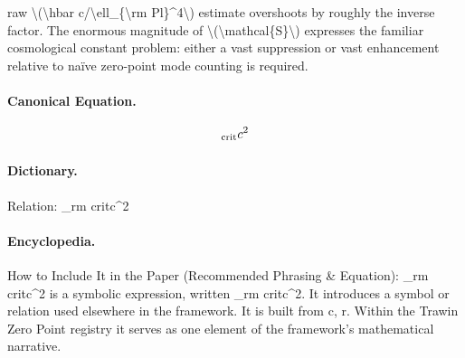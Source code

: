 raw \textbackslash{}(\textbackslash{}hbar c/\textbackslash{}ell\_\{\textbackslash{}rm Pl\}\textasciicircum{}4\textbackslash{}) estimate overshoots by roughly the inverse factor. The enormous magnitude of \textbackslash{}(\textbackslash{}mathcal\{S\}\textbackslash{}) expresses the familiar cosmological constant problem: either a vast suppression or vast enhancement relative to naïve zero-point mode counting is required.

\paragraph{Canonical Equation.}
\[
_{\rm crit}c^2
\]

\paragraph{Dictionary.}
Relation: \_rm critc\textasciicircum{}2

\paragraph{Encyclopedia.}
How to Include It in the Paper (Recommended Phrasing \& Equation): \_rm critc\textasciicircum{}2 is a symbolic expression, written \_rm critc\textasciicircum{}2. It introduces a symbol or relation used elsewhere in the framework. It is built from c, r. Within the Trawin Zero Point registry it serves as one element of the framework's mathematical narrative.
